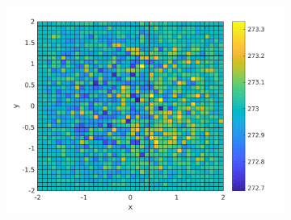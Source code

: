\begin{frame}
\begin{figure}
\begin{subfigure}[t]{0.5\textwidth}
    \end{subfigure}%
    ~ 
    \begin{subfigure}[t]{0.5\textwidth}
        \centering
        \includegraphics[width=0.725\linewidth]{../../results/simulations/100/solution_2D/solution_2D_sim100_step01_time250_boundary2.pdf}
    \end{subfigure}
\end{figure}
\end{frame}

